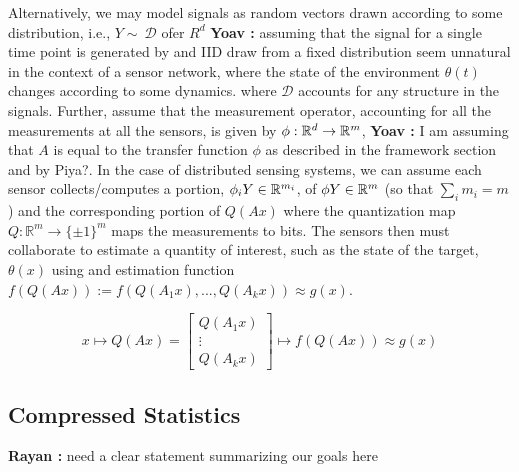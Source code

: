 \documentclass{article}
\newcommand{\comment}[3]{{\color{#1} {\bf #2 :} #3}}
\newcommand{\yoav}[1]{\comment{magenta}{Yoav}{#1}}
\newcommand{\rayan}[1]{\comment{red}{Rayan}{#1}}
\begin{document}
Alternatively, we may model signals as random vectors drawn according
to some distribution, i.e., $Y\sim~\mathcal{D}$ ofer $R^d$
\yoav{assuming that the signal for a single time point is generated by
  and IID draw from a fixed distribution seem unnatural in the context
  of a sensor network, where the state of the environment $\theta(t)$
  changes according to some dynamics.} where $\mathcal{D}$ accounts
for any structure in the signals. Further, assume that the measurement
operator, accounting for all the measurements at all the sensors, is
given by $\phi:\mathbb{R}^d \to \mathbb{R}^m$, \yoav{I am
  assuming that $A$ is equal to the transfer function $\phi$ as described in
  the framework section and by Piya?}. In
the case of distributed sensing systems, we can assume each sensor
collects/computes a portion, $\phi_i Y \in \mathbb{R}^{m_i}$, of
$\phi Y \in \mathbb{R}^m$ (so that $\sum_i{m_i}=m$) and the corresponding portion
of ${Q}(Ax)$ where the quantization map $Q: \mathbb{R}^m \to \{\pm
1\}^m $ maps the measurements to bits. The sensors then must
collaborate to estimate a  quantity of interest,
such as the state of the target, 
$\theta(x)$ using and estimation function $f(Q(Ax)):=f\left(Q(A_1x),...,Q(A_kx)\right)\approx g(x)$.

\begin{equation}
x 
\mapsto Q(Ax) =\left[ \begin{array}{c} Q(A_1 x) \\ \vdots \\ Q(A_k x) \end{array}\right] \mapsto f(Q(Ax))\approx g(x)
\end{equation}




\subsection{Compressed Statistics}
\rayan{need a clear statement summarizing our goals here}
\end{document}
